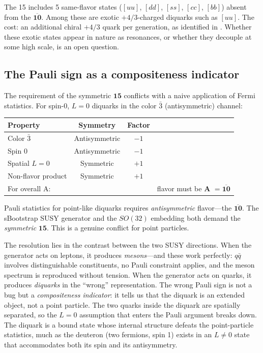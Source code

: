 \documentclass[12pt,a4paper]{article}
\begin{document}
The 15 includes 5 same-flavor states ($[uu]$, $[dd]$, $[ss]$, 
$[cc]$, $[bb]$) absent from the $\overline{\mathbf{10}}$. Among 
these are exotic $+4/3$-charged diquarks such as $[uu]$. The cost: 
an additional chiral $+4/3$ quark per generation, as identified 
in \cite{Rivero2005}. Whether these exotic states appear in nature 
as resonances, or whether they decouple at some high scale, is an 
open question.

\subsection{The Pauli sign as a compositeness indicator}
\label{subsec:pauli}

The requirement of the symmetric $\mathbf{15}$ conflicts with a 
naive application of Fermi statistics. For spin-0, $L=0$ diquarks 
in the color $\bar{3}$ (antisymmetric) channel:

\begin{center}
\begin{tabular}{lccc}
\toprule
Property & Symmetry & Factor & \\
\midrule
Color $\bar{3}$ & Antisymmetric & $-1$ & \\
Spin 0 & Antisymmetric & $-1$ & \\
Spatial $L=0$ & Symmetric & $+1$ & \\
\midrule
Non-flavor product & Symmetric & $+1$ & \\
For overall A: & & & flavor must be \textbf{A} $= \overline{\mathbf{10}}$ \\
\bottomrule
\end{tabular}
\end{center}

Pauli statistics for point-like diquarks requires 
\emph{antisymmetric} flavor---the $\overline{\mathbf{10}}$. 
The sBootstrap SUSY generator and the $SO(32)$ embedding both 
demand the \emph{symmetric} $\mathbf{15}$. This is a genuine 
conflict for point particles.

The resolution lies in the contrast between the two SUSY 
directions. When the generator acts on leptons, it produces 
\emph{mesons}---and these work perfectly: $q\bar{q}$ involves 
distinguishable constituents, no Pauli constraint applies, and 
the meson spectrum is reproduced without tension. When the 
generator acts on quarks, it produces \emph{diquarks} in the 
``wrong'' representation. The wrong Pauli sign is not a bug but 
a \emph{compositeness indicator}: it tells us that the diquark 
is an extended object, not a point particle. The two quarks inside 
the diquark are spatially separated, so the $L=0$ assumption 
that enters the Pauli argument breaks down. The diquark is a 
bound state whose internal structure defeats the point-particle 
statistics, much as the deuteron (two fermions, spin 1) exists 
in an $L \neq 0$ state that accommodates both its spin and its 
antisymmetry.
\end{document}
